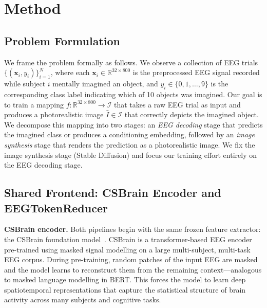 \documentclass{article}
\begin{document}
\section{Method}

\subsection{Problem Formulation}

We frame the problem formally as follows. We observe a collection of EEG trials $\{(\mathbf{x}_i, y_i)\}_{i=1}^{N}$, where each $\mathbf{x}_i \in \mathbb{R}^{32 \times 800}$ is the preprocessed EEG signal recorded while subject $i$ mentally imagined an object, and $y_i \in \{0, 1, \ldots, 9\}$ is the corresponding class label indicating which of 10 objects was imagined. Our goal is to train a mapping $f: \mathbb{R}^{32 \times 800} \to \mathcal{I}$ that takes a raw EEG trial as input and produces a photorealistic image $\hat{I} \in \mathcal{I}$ that correctly depicts the imagined object. We decompose this mapping into two stages: an \emph{EEG decoding} stage that predicts the imagined class or produces a conditioning embedding, followed by an \emph{image synthesis} stage that renders the prediction as a photorealistic image. We fix the image synthesis stage (Stable Diffusion) and focus our training effort entirely on the EEG decoding stage.

\subsection{Shared Frontend: CSBrain Encoder and EEGTokenReducer}

\textbf{CSBrain encoder.}
Both pipelines begin with the same frozen feature extractor: the CSBrain foundation model~\citep{zhu2024csbrain}. CSBrain is a transformer-based EEG encoder pre-trained using masked signal modelling on a large multi-subject, multi-task EEG corpus. During pre-training, random patches of the input EEG are masked and the model learns to reconstruct them from the remaining context---analogous to masked language modelling in BERT. This forces the model to learn deep spatiotemporal representations that capture the statistical structure of brain activity across many subjects and cognitive tasks.
\end{document}
